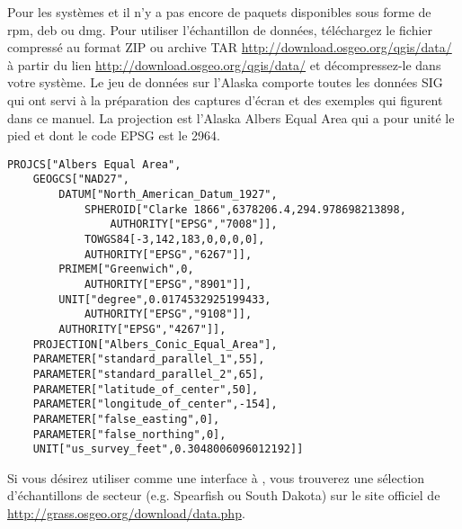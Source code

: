 \nix \osx Pour les systèmes \tux et \mac il n'y a pas encore de paquets disponibles sous forme de rpm, deb ou dmg. Pour utiliser l'échantillon de données, téléchargez le fichier compressé au format ZIP ou archive TAR \url{http://download.osgeo.org/qgis/data/}
à partir du lien \url{http://download.osgeo.org/qgis/data/} et décompressez-le dans votre système. Le jeu de données sur l'Alaska comporte toutes les données SIG qui ont servi à la préparation des captures d'écran et des exemples qui figurent dans ce manuel. La projection est l'Alaska Albers Equal Area qui a pour unité le pied et dont le code EPSG est le 2964.
\par
\begin{verbatim}
PROJCS["Albers Equal Area",
    GEOGCS["NAD27",
        DATUM["North_American_Datum_1927",
            SPHEROID["Clarke 1866",6378206.4,294.978698213898,
                AUTHORITY["EPSG","7008"]],
            TOWGS84[-3,142,183,0,0,0,0],
            AUTHORITY["EPSG","6267"]],
        PRIMEM["Greenwich",0,
            AUTHORITY["EPSG","8901"]],
        UNIT["degree",0.0174532925199433,
            AUTHORITY["EPSG","9108"]],
        AUTHORITY["EPSG","4267"]],
    PROJECTION["Albers_Conic_Equal_Area"],
    PARAMETER["standard_parallel_1",55],
    PARAMETER["standard_parallel_2",65],
    PARAMETER["latitude_of_center",50],
    PARAMETER["longitude_of_center",-154],
    PARAMETER["false_easting",0],
    PARAMETER["false_northing",0],
    UNIT["us_survey_feet",0.3048006096012192]]
\end{verbatim}


Si vous désirez utiliser \qg comme une interface à \grass, vous trouverez une sélection d'échantillons de secteur (e.g. Spearfish ou South Dakota) sur le site officiel de \grass \\
\url{http://grass.osgeo.org/download/data.php}. 



